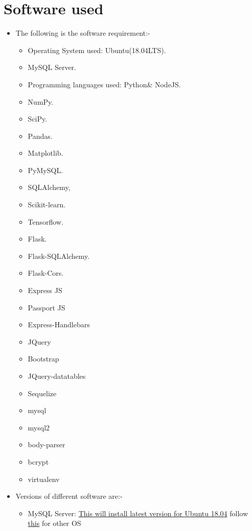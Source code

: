 \documentclass[a4paper,12pt,oneside]{book}
\begin{document}
\section{Software used}
\begin{itemize}
  \item The following is the software requirement:- \begin{itemize}
            \item Operating System used: Ubuntu(18.04LTS).
            \item MySQL Server.
            \item Programming languages used: Python\&  NodeJS.
            \item NumPy.
            \item SciPy.
            \item Pandas.
            \item Matplotlib.
            \item PyMySQL.
            \item SQLAlchemy,
            \item Scikit-learn.
            \item Tensorflow.
            \item Flask.
            \item Flask-SQLAlchemy.
            \item Flask-Cors.
            \item Express JS
            \item Passport JS
            \item Express-Handlebars
            \item JQuery
            \item Bootstrap
            \item JQuery-datatables
            \item Sequelize
            \item mysql
            \item mysql2
            \item body-parser
            \item bcrypt
            \item virtualenv
        \end{itemize}
  \item Versions of different software are:-\begin{itemize}
      \item MySQL Server: \href{https://linuxize.com/post/how-to-install-mysql-on-ubuntu-18-04/}{This will install latest version for Ubuntu 18.04} follow \href{https://dev.mysql.com/downloads/}{this} for other OS

\end{itemize}
\end{itemize}
\end{document}
